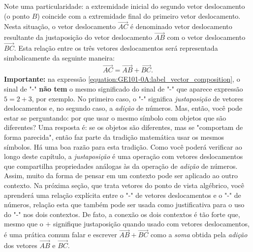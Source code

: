 Note uma particularidade: a extremidade inicial do segundo vetor deslocamento (o ponto \(B\)) coincide com a extremidade final do primeiro vetor deslocamento. Nesta situação, o vetor deslocamento \(\overrightarrow{AC}\) é denominado vetor deslocamento resultante da justaposição do vetor deslocamento \(\overrightarrow{AB}\) com o vetor deslocamento \(\overrightarrow{BC}\). Esta relação entre os três vetores deslocamentos será representada simbolicamente da seguinte maneira:
\label{\detokenize{GE101-0A:equation-label_vector_composition}}\begin{equation}\label{equation:GE101-0A:label_vector_composition}
\begin{split}\overrightarrow{AC} = \overrightarrow{AB} + \overrightarrow{BC}.\end{split}
\end{equation}
\textbf{Importante:} na expressão \eqref{equation:GE101-0A:label_vector_composition}, o sinal de "-"{} \textbf{não tem} o mesmo significado do sinal de "-"{} que aparece expressão \(5 = 2 + 3\), por exemplo. No primeiro caso, o "-"{} significa \textit{justaposição} de vetores deslocamentos e, no segundo caso, a \textit{adição} de números. Mas, então, você pode estar se perguntando: por que usar o mesmo símbolo com objetos que são diferentes? Uma resposta é: se os objetos são diferentes, mas se "comportam de forma parecida", então faz parte da tradição matemática usar os mesmos símbolos. Há uma boa razão para esta tradição. Como você poderá verificar ao longo deste capítulo, a \textit{justaposição} é uma operação com vetores deslocamentos que compartilha propriedades análogas às da operação de \textit{adição} de números. Assim, muito da forma de pensar em um contexto pode ser aplicado ao outro contexto. Na próxima seção, que trata vetores do ponto de vista algébrico, você aprenderá uma relação explícita entre o "-"{} de vetores deslocamentos e o "-"{} de números, relação esta que também pode ser usada como justificativa para o uso do "-"{} nos dois contextos. De fato, a conexão os dois contextos é tão forte que, mesmo que o \(+\) signifique justaposição quando usado com vetores deslocamentos, é uma prática comum falar e escrever \(\overrightarrow{AB} + \overrightarrow{BC}\) como a \textit{soma} obtida pela \textit{adição} dos vetores \(\overrightarrow{AB}\) e \(\overrightarrow{BC}\).
